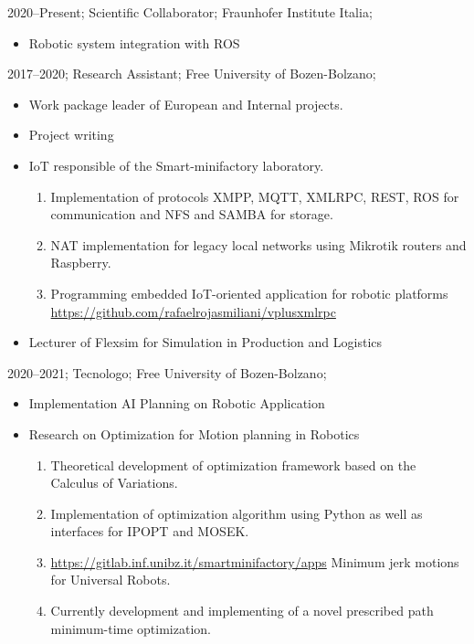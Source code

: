 \addwork%
{%
    2020--Present;%
    Scientific Collaborator;%
    Fraunhofer Institute Italia;%
    \begin{itemize}
        \item Robotic system integration with ROS
    \end{itemize}
}%
\addwork%
{%
    2017--2020;%
    Research Assistant;%
    Free University of Bozen-Bolzano;%
    \begin{itemize}
        \item Work package leader of European and Internal projects.
        \item Project writing
        \item IoT responsible of the Smart-minifactory laboratory.
            \ifdefined\extended
                \begin{enumerate}
                    \item Implementation of protocols XMPP, MQTT, XMLRPC, REST, ROS for communication and NFS and SAMBA for storage.
                    \item NAT implementation for legacy local networks using Mikrotik routers and Raspberry.
                    \item Programming embedded IoT-oriented application for robotic platforms \href{https://github.com/rafaelrojasmiliani/vplusxmlrpc}{https://github.com/rafaelrojasmiliani/vplusxmlrpc}
                \end{enumerate}
            \fi
        \item Lecturer of Flexsim for Simulation in Production and Logistics             
    \end{itemize}
}%
\addwork%
{%
    2020--2021;%
    Tecnologo;%
    Free University of Bozen-Bolzano;%
    \begin{itemize}
        \item Implementation AI Planning on Robotic Application
        \item Research on Optimization for Motion planning in Robotics
            \ifdefined\extended
                \begin{enumerate}
                    \item Theoretical development of optimization framework based on the Calculus of Variations.
                    \item Implementation of optimization algorithm using Python as well as interfaces for IPOPT and MOSEK.
                    \item \href{https://gitlab.inf.unibz.it/smartminifactory/apps}{https://gitlab.inf.unibz.it/smartminifactory/apps} Minimum jerk motions for Universal Robots.
                    \item Currently development and implementing of a novel prescribed path minimum-time optimization.
                \end{enumerate}
            \fi
    \end{itemize}
}%
